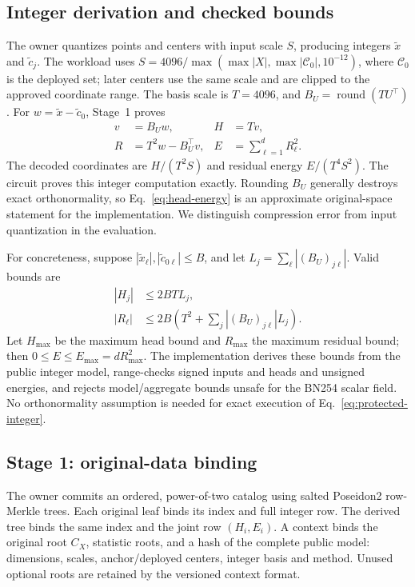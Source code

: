 \subsection{Integer derivation and checked bounds}\label{sec:protected-method}
The owner quantizes points and centers with input scale $S$, producing integers $\widetilde x$ and $\widetilde c_j$. The workload uses $S=4096/\max(\max|X|,\max|\mathcal C_0|,10^{-12})$, where $\mathcal C_0$ is the deployed set; later centers use the same scale and are clipped to the approved coordinate range. The basis scale is $T=4096$, and $B_U=\operatorname{round}(TU^\top)$. For $w=\widetilde x-\widetilde c_0$, Stage~1 proves
\begin{align}
v&=B_Uw,& H&=Tv,\nonumber\\
R&=T^2w-B_U^\top v,& E&=\sum_{\ell=1}^d R_\ell^2.\label{eq:protected-integer}
\end{align}
The decoded coordinates are $H/(T^2S)$ and residual energy $E/(T^4S^2)$. The circuit proves this integer computation exactly. Rounding $B_U$ generally destroys exact orthonormality, so Eq.~\eqref{eq:head-energy} is an approximate original-space statement for the implementation. We distinguish compression error from input quantization in the evaluation.

For concreteness, suppose $|\widetilde x_\ell|,|\widetilde c_{0\ell}|\le B$, and let $L_j=\sum_\ell |(B_U)_{j\ell}|$. Valid bounds are
\begin{align}
|H_j|&\le 2BTL_j,\nonumber\\
|R_\ell|&\le 2B\left(T^2+\sum_j|(B_U)_{j\ell}|L_j\right).\label{eq:row-bounds}
\end{align}
Let $H_{\max}$ be the maximum head bound and $R_{\max}$ the maximum residual bound; then $0\le E\le E_{\max}=dR_{\max}^2$. The implementation derives these bounds from the public integer model, range-checks signed inputs and heads and unsigned energies, and rejects model/aggregate bounds unsafe for the BN254 scalar field. No orthonormality assumption is needed for exact execution of Eq.~\eqref{eq:protected-integer}.

\subsection{Stage 1: original-data binding}\label{sec:query-relation}
The owner commits an ordered, power-of-two catalog using salted Poseidon2 row-Merkle trees. Each original leaf binds its index and full integer row. The derived tree binds the same index and the joint row $(H_i,E_i)$. A context binds the original root $C_X$, statistic roots, and a hash of the complete public model: dimensions, scales, anchor/deployed centers, integer basis and method. Unused optional roots are retained by the versioned context format.

